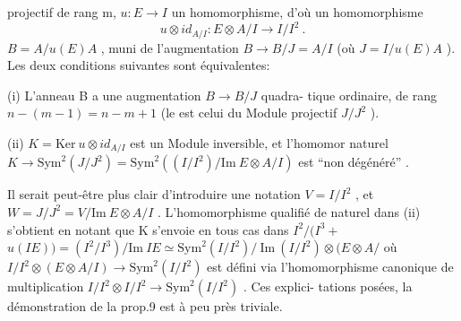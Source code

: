 
projectif de rang m,  $u{:}E \to I$ un homomorphisme, d'où un homomorphisme
\[ u\otimes id_{A/I} : E\otimes A/I \longrightarrow I/I^2 \ . \]
  $B = A/u(E)A$ , muni de l'augmentation $B\to B/J = A/I$
(où $J = I/u(E)A$ ). Les deux conditions suivantes sont équivalentes:

 (i) L'anneau  B  a une augmentation $B\to B/J$  quadra-%
tique ordinaire, de rang $n-(m-1)= n-m+1$ (le 
est  celui du Module projectif $J/J^2$ ).

 (ii) $K = \mathrm{Ker}\ u\otimes id_{A/I}$ est un Module inversible, et l'homomor
 naturel $K \longrightarrow \mathrm{Sym}^2(J/J^2) = \mathrm{Sym}^2( (I/I^2)/\mathrm{Im}\ E\otimes A/I )$ est
``non dégénéré'' .

Il serait peut-être plus clair d'introduire une notation $V = I/I^2$ ,
et $W = J/J^2 = V / \mathrm{Im}\ E\otimes A/I$ . L'homomorphisme qualifié de naturel
dans (ii) s'obtient en notant que K s'envoie en tous cas dans
 $I^2/(I^3 +$  $u(IE)) = (I^2/I^3)/\mathrm{Im}\ IE \simeq \mathrm{Sym}^2(I/I^2)/\ \mathrm{Im}\ (I/I^2)\otimes(E\otimes A/$
où $I/I^2 \otimes(E \otimes A/I) \to \mathrm{Sym}^2(I/I^2)$ est défini via l'homomorphisme
canonique de multiplication $I/I^2 \otimes I/I^2 \to \mathrm{Sym}^2(I/I^2 )$ . Ces explici-%
tations posées, la démonstration de la prop.9 est à peu près triviale.

